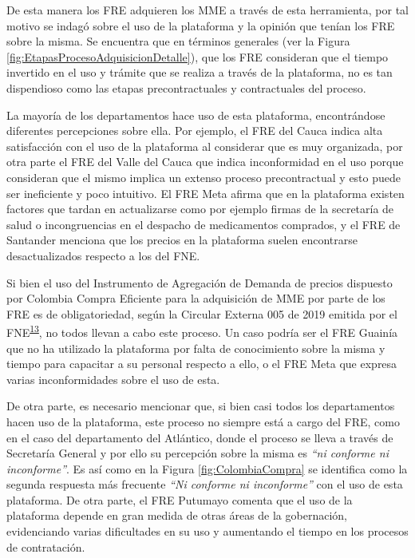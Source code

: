 \documentclass[
]{book}
\begin{document}
De esta manera los FRE adquieren los MME a través de esta herramienta, por tal motivo se indagó sobre el uso de la plataforma y la opinión que tenían los FRE sobre la misma. Se encuentra que en términos generales (ver la Figura \ref{fig:EtapasProcesoAdquisicionDetalle}), que los FRE consideran que el tiempo invertido en el uso y trámite que se realiza a través de la plataforma, no es tan dispendioso como las etapas precontractuales y contractuales del proceso.

La mayoría de los departamentos hace uso de esta plataforma, encontrándose diferentes percepciones sobre ella. Por ejemplo, el FRE del Cauca indica alta satisfacción con el uso de la plataforma al considerar que es muy organizada, por otra parte el FRE del Valle del Cauca que indica inconformidad en el uso porque consideran que el mismo implica un extenso proceso precontractual y esto puede ser ineficiente y poco intuitivo. El FRE Meta afirma que en la plataforma existen factores que tardan en actualizarse como por ejemplo firmas de la secretaría de salud o incongruencias en el despacho de medicamentos comprados, y el FRE de Santander menciona que los precios en la plataforma suelen encontrarse desactualizados respecto a los del FNE.

Si bien el uso del Instrumento de Agregación de Demanda de precios dispuesto por Colombia Compra Eficiente para la adquisición de MME por parte de los FRE es de obligatoriedad, según la Circular Externa 005 de 2019 emitida por el FNE\textsuperscript{\protect\hyperlink{ref-FNE005-2019}{13}}, no todos llevan a cabo este proceso. Un caso podría ser el FRE Guainía que no ha utilizado la plataforma por falta de conocimiento sobre la misma y tiempo para capacitar a su personal respecto a ello, o el FRE Meta que expresa varias inconformidades sobre el uso de esta.

De otra parte, es necesario mencionar que, si bien casi todos los departamentos hacen uso de la plataforma, este proceso no siempre está a cargo del FRE, como en el caso del departamento del Atlántico, donde el proceso se lleva a través de Secretaría General y por ello su percepción sobre la misma es \emph{``ni conforme ni inconforme''}. Es así como en la Figura \ref{fig:ColombiaCompra} se identifica como la segunda respuesta más frecuente \emph{``Ni conforme ni inconforme''} con el uso de esta plataforma. De otra parte, el FRE Putumayo comenta que el uso de la plataforma depende en gran medida de otras áreas de la gobernación, evidenciando varias dificultades en su uso y aumentando el tiempo en los procesos de contratación.
\end{document}

